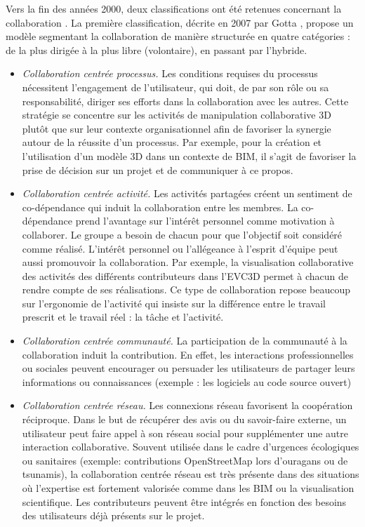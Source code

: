Vers la fin des années 2000, deux classifications ont été retenues concernant la 
collaboration \cite{Bauwens2011}.
La première classification, décrite en 2007 par Gotta \cite{Gotta2007}, propose 
un modèle segmentant la collaboration de manière structurée en quatre catégories 
: de la plus dirigée à la plus libre (volontaire), en passant par l'hybride.
\begin{itemize}
	\item \textit{Collaboration centrée processus.} Les conditions requises du 
	processus 
	nécessitent l'engagement de l'utilisateur, qui doit, de par son rôle ou sa 
	responsabilité, diriger ses efforts dans la collaboration avec les autres. Cette 
	stratégie se concentre sur les activités de manipulation collaborative \gls{3D} 
	plutôt que sur leur contexte organisationnel afin de favoriser la synergie autour de la 
	réussite d'un processus. Par exemple, pour la création et l'utilisation d'un 
	modèle 	3D dans un contexte de \gls{BIM}, il s'agit de favoriser la prise de décision sur un 
	projet et de communiquer à ce propos.
	
	\item \textit{Collaboration centrée activité.}
	Les activités partagées créent un sentiment de co-dé\-pendance qui induit la 
	collaboration entre les membres. La co-dépendance prend l'avantage sur l'intérêt personnel comme motivation à collaborer. Le groupe a besoin 
	de chacun pour que l'objectif soit considéré comme réalisé. L'intérêt personnel 
	ou l'allégeance à l'esprit d'équipe peut aussi promouvoir la collaboration. Par 
	exemple, la visualisation collaborative des activités des différents contributeurs 
	dans l'\gls{EVC3D} permet à chacun de rendre compte de ses réalisations. Ce 
	type de collaboration repose beaucoup sur l'ergonomie de l'activité qui insiste sur la 
	différence entre le travail prescrit et le travail réel : la tâche et l'activité.
	
	\item \textit{Collaboration centrée communauté.}
	La participation de la communauté à la collaboration induit la contribution. En 
	effet, les interactions professionnelles ou sociales peuvent encourager ou 
	persuader les utilisateurs de partager leurs informations ou connaissances 
	(exemple : les logiciels au code source ouvert)
	
	\item \textit{Collaboration centrée réseau.}
	Les connexions réseau favorisent la coopération réciproque. Dans le but de 
	récupérer des avis ou du savoir-faire externe, un utilisateur peut faire appel à 
	son réseau social pour supplémenter une autre interaction collaborative. 
	Souvent utilisée dans le cadre d'urgences écologiques ou sanitaires (exemple: 
	contributions OpenStreetMap lors d'ouragans ou de tsunamis), la collaboration 
	centrée réseau est très présente dans des situations où l'expertise est 
	fortement valorisée comme dans les \gls{BIM} ou la visualisation scientifique. Les 
	contributeurs peuvent être intégrés en fonction des besoins des utilisateurs déjà 
	présents sur le projet.
\end{itemize}
